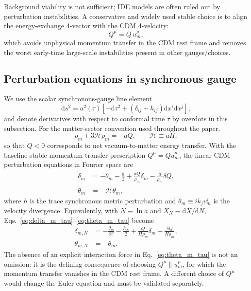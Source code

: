 \documentclass[pdflatex,sn-mathphys-num]{sn-jnl}%
\newcommand{\dd}{\mathrm{d}}
\newcommand{\cH}{\mathcal{H}}
\begin{document}
Background viability is not sufficient; IDE models are often ruled out by
perturbation instabilities. A conservative and widely used stable choice is
to align the energy-exchange 4-vector with the CDM 4-velocity:
\begin{equation}
Q^\mu = Q\,u_m^\mu,
\label{eq:Qmu_choice}
\end{equation}
which avoids unphysical momentum transfer in the CDM rest frame and removes
the worst early-time large-scale instabilities present in other gauges/choices.

\subsection{Perturbation equations in synchronous gauge}
\label{subsec:pert_eqs}

We use the scalar synchronous-gauge line element
\begin{equation}
\dd s^2=a^2(\tau)\left[-\dd\tau^2+
\left(\delta_{ij}+h_{ij}\right)\dd x^i\dd x^j\right],
\end{equation}
and denote derivatives with respect to conformal time $\tau$ by overdots in
this subsection. For the matter-sector convention used throughout the paper,
\begin{equation}
\dot\rho_m+3\cH\rho_m=-aQ,
\qquad \cH\equiv aH,
\end{equation}
so that $Q<0$ corresponds to net vacuum-to-matter energy transfer. With the
baseline stable momentum-transfer prescription $Q^\mu=Q u_m^\mu$, the linear
CDM perturbation equations in Fourier space are \cite{Valiviita:2008iv}
\begin{align}
\dot\delta_m &= -\theta_m-\frac{\dot h}{2}
+\frac{aQ}{\rho_m}\delta_m
-\frac{a}{\rho_m}\delta Q,
\label{eq:delta_m_tau}\\
\dot\theta_m &= -\cH\theta_m,
\label{eq:theta_m_tau}
\end{align}
where $h$ is the trace synchronous metric perturbation and
$\theta_m\equiv i k_j v_m^j$ is the velocity divergence. Equivalently, with
$N\equiv\ln a$ and $X_N\equiv\dd X/\dd N$, Eqs.~\eqref{eq:delta_m_tau}--\eqref{eq:theta_m_tau}
become
\begin{align}
\delta_{m,N} &= -\frac{\theta_m}{\cH}-\frac{h_N}{2}
+\frac{Q}{H\rho_m}\delta_m
-\frac{\delta Q}{H\rho_m},
\label{eq:delta_m_N}\\
\theta_{m,N} &= -\theta_m.
\label{eq:theta_m_N}
\end{align}
The absence of an explicit interaction force in Eq.~\eqref{eq:theta_m_tau} is
not an omission: it is the defining consequence of choosing $Q^\mu\parallel
u_m^\mu$, for which the momentum transfer vanishes in the CDM rest frame. A
different choice of $Q^\mu$ would change the Euler equation and must be
validated separately.
\end{document}
